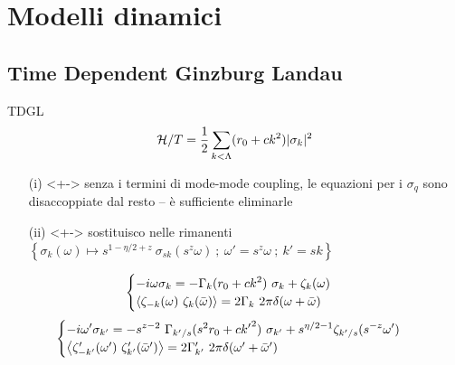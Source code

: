 \documentclass[10pt]{beamer}
\begin{document}
\section{Modelli dinamici}
\subsection{Time Dependent Ginzburg Landau}
\begin{frame}{TDGL}
 \transwipe[direction=270]
 \begin{equation*}
  \ham/T = \frac{1}{2} \sum_{k<\Lambda} (r_0 + ck^2)|\sigma_k|^2 %
 \end{equation*}
 \begin{itemize}
  \item[(i)]<+-> senza i termini di mode-mode coupling, le equazioni per i $\sigma_q$ sono disaccoppiate dal resto -- è sufficiente eliminarle
  \item[(ii)]<+-> sostituisco nelle rimanenti $ \left \{\sigma_k(\omega) \mapsto s^{1-\eta/2 + z}\ \sigma_{sk}(s^z\omega)\ ; \ \omega' = s^{z} \omega\ ;\ k' = sk \right\} $
 \end{itemize}
{
\begin{equation*}
  \begin{cases}
   \displaystyle -i\omega \sigma_k = -\Gamma_k(r_0 + ck^2)  \ \sigma_k + \zeta_k(\omega)\\
   \left \langle \zeta_{-k}(\omega)\ \zeta_k(\bar\omega) \right \rangle = 2\Gamma_k\ 2\pi \delta(\omega + \bar\omega)\\
   \end{cases}
\end{equation*}
}
{
\begin{equation*}
 \begin{cases}
    \displaystyle -i\omega' \sigma_{k'} = -s^{z-2}\ \Gamma_{k'/s}(s^2 r_0 + c{k'}^2)  \ \sigma_{k'} + s^{\eta/2 -1}\zeta_{k'/s}(s^{-z}\omega') \\
    \left \langle \zeta'_{-k'}(\omega')\ \zeta'_{k'}(\bar\omega') \right \rangle = 2 \Gamma'_{k'}\ 2\pi \delta(\omega' + \bar\omega')
   \end{cases} 
\end{equation*}
}
\end{frame}
\end{document}

